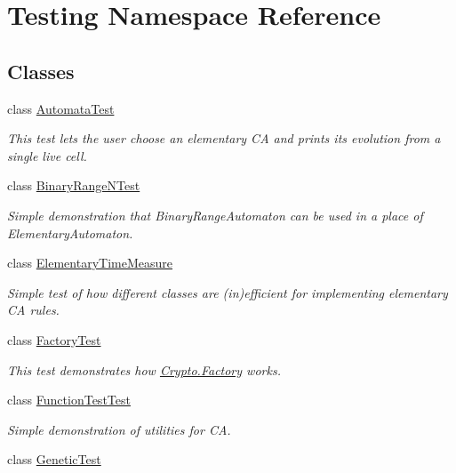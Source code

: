 \hypertarget{namespace_testing}{}\section{Testing Namespace Reference}
\label{namespace_testing}
\subsection*{Classes}
\begin{DoxyCompactItemize}
\item 
class \hyperlink{class_testing_1_1_automata_test}{Automata\+Test}
\begin{DoxyCompactList}\small\item\em This test lets the user choose an elementary C\+A and prints its evolution from a single live cell. \end{DoxyCompactList}\item 
class \hyperlink{class_testing_1_1_binary_range_n_test}{Binary\+Range\+N\+Test}
\begin{DoxyCompactList}\small\item\em Simple demonstration that {\ttfamily Binary\+Range\+Automaton} can be used in a place of {\ttfamily Elementary\+Automaton}. \end{DoxyCompactList}\item 
class \hyperlink{class_testing_1_1_elementary_time_measure}{Elementary\+Time\+Measure}
\begin{DoxyCompactList}\small\item\em Simple test of how different classes are (in)efficient for implementing elementary C\+A rules. \end{DoxyCompactList}\item 
class \hyperlink{class_testing_1_1_factory_test}{Factory\+Test}
\begin{DoxyCompactList}\small\item\em This test demonstrates how {\ttfamily \hyperlink{class_crypto_1_1_factory}{Crypto.\+Factory}} works. \end{DoxyCompactList}\item 
class \hyperlink{class_testing_1_1_function_test_test}{Function\+Test\+Test}
\begin{DoxyCompactList}\small\item\em Simple demonstration of utilities for C\+A. \end{DoxyCompactList}\item 
class \hyperlink{class_testing_1_1_genetic_test}{Genetic\+Test}

\end{DoxyCompactItemize}
